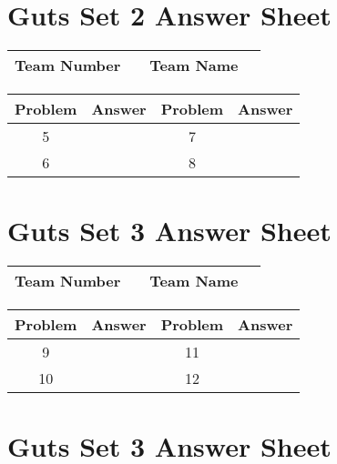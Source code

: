 \documentclass[14pt]{article}
\begin{document}
\vspace{30px}

\section*{Guts Set 2 Answer Sheet}

\begin{center}
\begin{tabular}{|r|r|r|r|}
\hline
	Team Number & \hspace{10em} &
	Team Name & \hspace{15em} \\ \hline
\end{tabular}
\end{center}
\begin{tabularx}{\textwidth}{|c|l|c|X|}\hline
	Problem & Answer & Problem & Answer \\\hline
	5 & \hspace{15em} & 7 & \\\hline
	6 & & 8 & \\\hline
\end{tabularx}

\section*{Guts Set 3 Answer Sheet}

\begin{center}
\begin{tabular}{|r|r|r|r|}
\hline
	Team Number & \hspace{10em} &
	Team Name & \hspace{15em} \\ \hline
\end{tabular}
\end{center}
\begin{tabularx}{\textwidth}{|c|l|c|X|}\hline
	Problem & Answer & Problem & Answer \\\hline
	9 & \hspace{15em} & 11 & \\\hline
	10 & & 12 & \\\hline
\end{tabularx}

\vspace{30px}

\section*{Guts Set 3 Answer Sheet}
\end{document}
